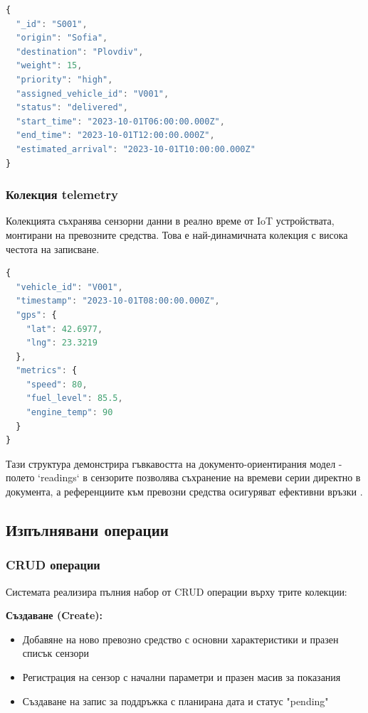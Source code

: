 \begin{lstlisting}[language=JavaScript,caption=Примерен документ от колекцията shipments]
{
  "_id": "S001",
  "origin": "Sofia",
  "destination": "Plovdiv",
  "weight": 15,
  "priority": "high",
  "assigned_vehicle_id": "V001",
  "status": "delivered",
  "start_time": "2023-10-01T06:00:00.000Z",
  "end_time": "2023-10-01T12:00:00.000Z",
  "estimated_arrival": "2023-10-01T10:00:00.000Z"
}
\end{lstlisting}

\subsubsection{Колекция telemetry}

Колекцията съхранява сензорни данни в реално време от IoT устройствата, монтирани на превозните средства. Това е най-динамичната колекция с висока честота на записване.

\begin{lstlisting}[language=JavaScript,caption=Примерен документ от колекцията telemetry]
{
  "vehicle_id": "V001",
  "timestamp": "2023-10-01T08:00:00.000Z",
  "gps": {
    "lat": 42.6977,
    "lng": 23.3219
  },
  "metrics": {
    "speed": 80,
    "fuel_level": 85.5,
    "engine_temp": 90
  }
}
\end{lstlisting}

Тази структура демонстрира гъвкавостта на документо-ориентирания модел - полето `readings` в сензорите позволява съхранение на времеви серии директно в документа, а референциите към превозни средства осигуряват ефективни връзки \cite{json_schema}.

\subsection{Изпълнявани операции}

\subsubsection{CRUD операции}

Системата реализира пълния набор от CRUD операции върху трите колекции:

\textbf{Създаване (Create):}
\begin{itemize}
    \item Добавяне на ново превозно средство с основни характеристики и празен списък сензори
    \item Регистрация на сензор с начални параметри и празен масив за показания
    \item Създаване на запис за поддръжка с планирана дата и статус "pending"
\end{itemize}


